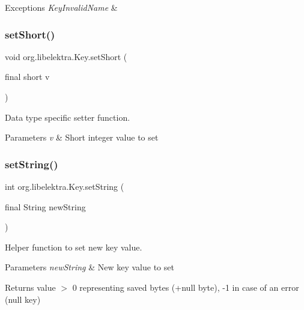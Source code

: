 \begin{DoxyExceptions}{Exceptions}
{\em Key\+Invalid\+Name} & \\
\hline
\end{DoxyExceptions}
\mbox{\label{classorg_1_1libelektra_1_1Key_ac1621a8d43992b40b6b20a0e45182376}} 
\subsubsection{\texorpdfstring{setShort()}{setShort()}}
{\footnotesize\ttfamily void org.\+libelektra.\+Key.\+set\+Short (\begin{DoxyParamCaption}\item[{final short}]{v }\end{DoxyParamCaption})\hspace{0.3cm}{\ttfamily [inline]}}



Data type specific setter function. 


\begin{DoxyParams}{Parameters}
{\em v} & Short integer value to set \\
\hline
\end{DoxyParams}
\mbox{\label{classorg_1_1libelektra_1_1Key_a5ccfaddf110c47c83686655a694ee76d}} 
\subsubsection{\texorpdfstring{setString()}{setString()}}
{\footnotesize\ttfamily int org.\+libelektra.\+Key.\+set\+String (\begin{DoxyParamCaption}\item[{final String}]{new\+String }\end{DoxyParamCaption})\hspace{0.3cm}{\ttfamily [inline]}}



Helper function to set new key value. 


\begin{DoxyParams}{Parameters}
{\em new\+String} & New key value to set \\
\hline
\end{DoxyParams}
\begin{DoxyReturn}{Returns}
value $>$ 0 representing saved bytes (+null byte), -\/1 in case of an error (null key) 
\end{DoxyReturn}
\mbox{\label{classorg_1_1libelektra_1_1Key_a2814202c93e4f4dac842b2d4856ba78e}} 

